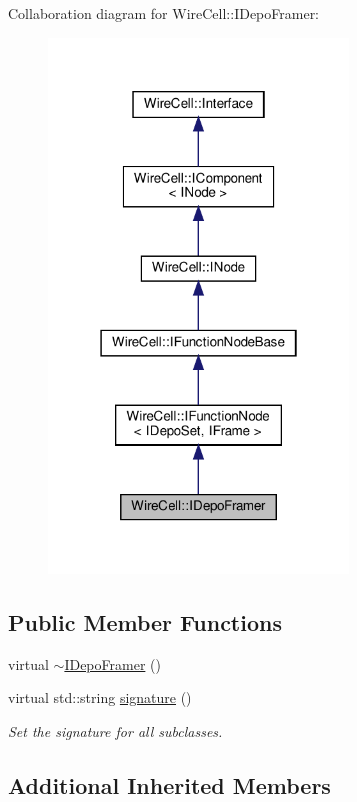 Collaboration diagram for Wire\+Cell\+:\+:I\+Depo\+Framer\+:
\nopagebreak
\begin{figure}[H]
\begin{center}
\leavevmode
\includegraphics[width=226pt]{class_wire_cell_1_1_i_depo_framer__coll__graph}
\end{center}
\end{figure}
\subsection*{Public Member Functions}
\begin{DoxyCompactItemize}
\item 
virtual \hyperlink{class_wire_cell_1_1_i_depo_framer_ae30f98470a1f512cdc38e35799954052}{$\sim$\+I\+Depo\+Framer} ()
\item 
virtual std\+::string \hyperlink{class_wire_cell_1_1_i_depo_framer_ad188e2d941d34583f13758689d0c331f}{signature} ()
\begin{DoxyCompactList}\small\item\em Set the signature for all subclasses. \end{DoxyCompactList}\end{DoxyCompactItemize}
\subsection*{Additional Inherited Members}


